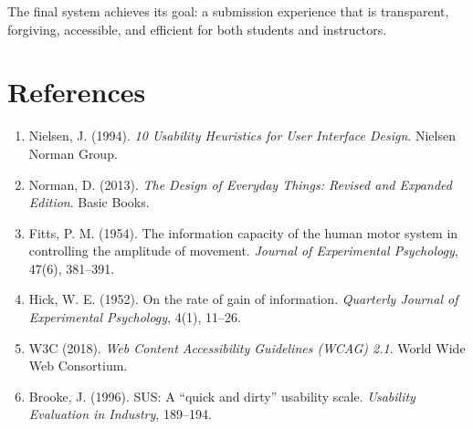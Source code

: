 \documentclass[12pt, a4paper]{article}
\begin{document}
The final system achieves its goal: a submission experience that is transparent, forgiving, accessible, and efficient for both students and instructors.

\section*{References}

\begin{enumerate}[noitemsep]
  \item Nielsen, J. (1994). \textit{10 Usability Heuristics for User Interface Design}. Nielsen Norman Group.
  \item Norman, D. (2013). \textit{The Design of Everyday Things: Revised and Expanded Edition}. Basic Books.
  \item Fitts, P. M. (1954). The information capacity of the human motor system in controlling the amplitude of movement. \textit{Journal of Experimental Psychology}, 47(6), 381–391.
  \item Hick, W. E. (1952). On the rate of gain of information. \textit{Quarterly Journal of Experimental Psychology}, 4(1), 11–26.
  \item W3C (2018). \textit{Web Content Accessibility Guidelines (WCAG) 2.1}. World Wide Web Consortium.
  \item Brooke, J. (1996). SUS: A ``quick and dirty'' usability scale. \textit{Usability Evaluation in Industry}, 189–194.
\end{enumerate}
\end{document}
